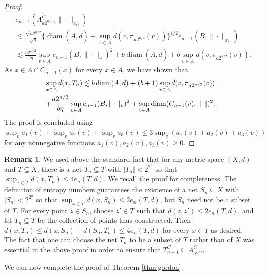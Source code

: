 \documentclass[10pt,reqno]{amsart}
\theoremstyle{definition}
\newtheorem{rem}[thm]{Remark}
\numberwithin{equation}{section}
\numberwithin{figure}{section}
\numberwithin{table}{section}
\newcommand{\diam}{\mathop{\mathrm{diam}}}
\newcommand{\mynegspace}{\hspace{-0.12em}}
\newcommand{\vvv}{\rvert\mynegspace\rvert\mynegspace\rvert}
\newcommand{\nnn}[1]{{\vvv #1 \vvv}}
\begin{document}
\begin{proof}
\begin{align*}
	&e_{n-1}(A_{a2^{n/2}}^C,\|\cdot\|_{x_C}) \\ 
	&\lesssim
	\frac{\sqrt{a2^{n/2}}}{\sqrt{\eta}}
	\bigg\{
	\diam(A,\tilde d) + \sup_{v\in A}\tilde d(v,\pi_{a2^{n/2}}(v))
	\Bigg\}^{1/2} 
	e_{n-1}(B,\|\cdot\|_{x_C}) 
	\\ &\lesssim
	\frac{a2^{n/2}}{b\eta}
	\sup_{v\in A}
	e_{n-1}(B,\|\cdot\|_{v})^2 +
	b\diam(A,\tilde d) + b\sup_{v\in A}\tilde d(v,\pi_{a2^{n/2}}(v)).
\end{align*}
As $x\in A\cap C_{n-1}(x)$ for every $x\in A$, we have shown that
\begin{multline*}
	\sup_{x\in A}\tilde d(x,T_n) \lesssim
        b\diam(A,\tilde d)  +
	(b+1)\sup_{v\in A}\tilde d(v,\pi_{a2^{n/2}}(v)) \\ +
        \frac{a2^{n/2}}{b\eta}
        \sup_{v\in A}
        e_{n-1}(B,\|\cdot\|_{v})^2 +
	\sup_{v\in A}
	\diam(C_{n-1}(v),\nnn{\cdot})^2.
\end{multline*}
The proof is concluded using
$\sup_v a_1(v) + \sup_v a_2(v) + \sup_v a_3(v) \le
3\sup_v(a_1(v)+a_2(v)+a_3(v))$ for any nonnegative functions 
$a_1(v),a_2(v),a_3(v)\ge 0$.
\end{proof}

\begin{rem}
\label{rem:propercov}
We used above the standard fact that for any metric space $(X,d)$ and 
$T\subseteq X$, there is a net $T_n\subseteq T$ with $|T_n|<2^{2^n}$
so that $\sup_{x\in T}d(x,T_n)\le 4e_n(T,d)$. We recall 
the proof for completeness. The definition of entropy numbers guarantees 
the existence of a net $S_n\subseteq X$ with $|S_n|<2^{2^n}$ 
so that $\sup_{x\in T}d(x,S_n)\le 2e_n(T,d)$, but $S_n$ need not be a 
subset of $T$. For every point $z\in S_n$, choose $z'\in T$ such that 
$d(z,z')\le 2e_n(T,d)$, and let $T_n\subseteq T$ be the collection of 
points thus constructed. Then $d(x,T_n) \le d(x,S_n) + d(S_n,T_n) \le 
4e_n(T,d)$ for every $x\in T$ as desired. The fact that one can choose the 
net $T_n$ to be a subset of $T$ rather than of $X$ was essential in the 
above proof in order to ensure that $T_{n-1}^C\subseteq A_{a2^{n/2}}^C$.
\end{rem}

We can now complete the proof of Theorem \ref{thm:gordon}.
\end{document}
